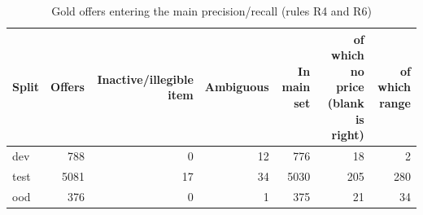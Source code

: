 \begin{table}[t]
\centering
\caption{Gold offers entering the main precision/recall (rules R4 and R6)}
\label{tab:scoringset}
\small
\begin{tabular}{lrrrrrr}
\toprule
Split & Offers & Inactive/illegible item & Ambiguous & In main set & of which no price (blank is right) & of which range \\
\midrule
dev & 788 & 0 & 12 & 776 & 18 & 2 \\
test & 5081 & 17 & 34 & 5030 & 205 & 280 \\
ood & 376 & 0 & 1 & 375 & 21 & 34 \\
\bottomrule
\end{tabular}
\end{table}
